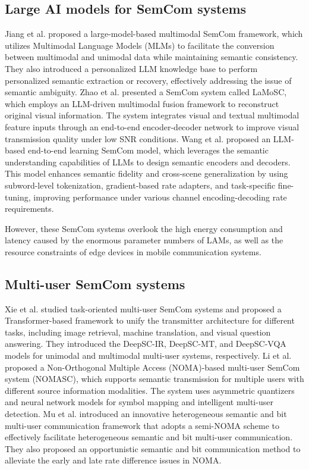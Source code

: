 \subsection{Large AI models for SemCom systems}
Jiang et al. \cite{jiang2024large} proposed a large-model-based multimodal SemCom framework, which utilizes Multimodal Language Models (MLMs) to facilitate the conversion between multimodal and unimodal data while maintaining semantic consistency. They also introduced a personalized LLM knowledge base to perform personalized semantic extraction or recovery, effectively addressing the issue of semantic ambiguity. 
Zhao et al. \cite{zhao2024lamosc} presented a SemCom system called LaMoSC, which employs an LLM-driven multimodal fusion framework to reconstruct original visual information. The system integrates visual and textual multimodal feature inputs through an end-to-end encoder-decoder network to improve visual transmission quality under low SNR conditions. 
Wang et al. \cite{wang2024uses} proposed an LLM-based end-to-end learning SemCom model, which leverages the semantic understanding capabilities of LLMs to design semantic encoders and decoders. This model enhances semantic fidelity and cross-scene generalization by using subword-level tokenization, gradient-based rate adapters, and task-specific fine-tuning, improving performance under various channel encoding-decoding rate requirements.

However, these SemCom systems overlook the high energy consumption and latency caused by the enormous parameter numbers of LAMs, as well as the resource constraints of edge devices in mobile communication systems.

\subsection{Multi-user SemCom systems}
Xie et al. \cite{xie2022task} studied task-oriented multi-user SemCom systems and proposed a Transformer-based framework to unify the transmitter architecture for different tasks, including image retrieval, machine translation, and visual question answering. They introduced the DeepSC-IR, DeepSC-MT, and DeepSC-VQA models for unimodal and multimodal multi-user systems, respectively. 
Li et al. \cite{li2023non} proposed a Non-Orthogonal Multiple Access (NOMA)-based multi-user SemCom system (NOMASC), which supports semantic transmission for multiple users with different source information modalities. The system uses asymmetric quantizers and neural network models for symbol mapping and intelligent multi-user detection. 
Mu et al. \cite{mu2022semantic} introduced an innovative heterogeneous semantic and bit multi-user communication framework that adopts a semi-NOMA scheme to effectively facilitate heterogeneous semantic and bit multi-user communication. They also proposed an opportunistic semantic and bit communication method to alleviate the early and late rate difference issues in NOMA.

